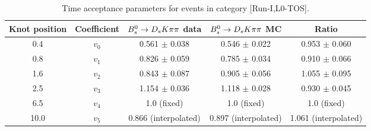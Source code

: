 \begin{table}[h]
\centering
\small
\caption{Time acceptance parameters for events in category [\textsf{Run-I},\textsf{L0-TOS}].}
\begin{tabular}{c c c c c}
\hline
\hline
Knot position & Coefficient & ${{B}^0_{s}}\rightarrow{\ensuremath{{D}_{s}}}{\ensuremath{K}}{\ensuremath{\pi}}{\ensuremath{\pi}}$ data & ${{B}^0_{s}}\rightarrow{\ensuremath{{D}_{s}}}{\ensuremath{K}}{\ensuremath{\pi}}{\ensuremath{\pi}}$ MC & Ratio \\
\hline
0.4 & $v_{0}$ & 0.561 $\pm$ 0.038 & 0.546 $\pm$ 0.022 & 0.953 $\pm$ 0.060\\
0.8 & $v_{1}$ & 0.826 $\pm$ 0.059 & 0.785 $\pm$ 0.034 & 0.910 $\pm$ 0.066\\
1.6 & $v_{2}$ & 0.843 $\pm$ 0.087 & 0.905 $\pm$ 0.056 & 1.055 $\pm$ 0.095\\
2.5 & $v_{3}$ & 1.154 $\pm$ 0.036 & 1.118 $\pm$ 0.028 & 0.930 $\pm$ 0.045\\
6.5 & $v_{4}$ &  1.0 (fixed) & 1.0 (fixed) & 1.0 (fixed)\\
10.0 & $v_{5}$ & 0.866 (interpolated) & 0.897 (interpolated) & 1.061 (interpolated) \\
\hline
\hline
\end{tabular}
\label{table:splines}
\end{table}
